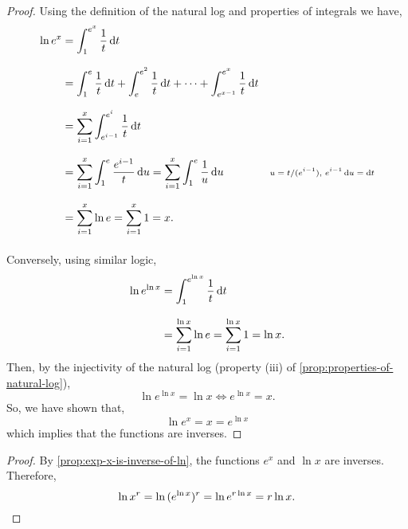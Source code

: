 \documentclass[MathsNotesBase.tex]{subfiles}
\begin{document}
{	\bigskip\bigskip
	\begin{proof}
		Using the definition of the natural log and properties of integrals we have,
		\begin{align*}
		\ln{e^x} &= \int_1^{e^x} \frac{1}{t} \dif t \\[8pt]
		  		 &= \int_1^{e} \frac{1}{t} \dif t + \int_e^{e^2} \frac{1}{t} \dif t + \cdots + \int_{e^{x-1}}^{e^x} \frac{1}{t} \dif t &\sidecomment{} \\[8pt]
		  		 &= \sum_{i=1}^x \int_{e^{i-1}}^{e^i} \frac{1}{t} \dif t \\[8pt]
		  		 &= \sum_{i=1}^x \int_{1}^e \frac{e^{i-1}}{t} \dif u = \sum_{i=1}^x \int_{1}^e \frac{1}{u} \dif u &\sidecomment{${ u = t/(e^{i-1}),\, e^{i-1}\dif u = \dif t }$}\\[8pt]
		  		 &= \sum_{i=1}^x \ln{e} = \sum_{i=1}^x 1 = x. \\[8pt]
		\end{align*}
		Conversely, using similar logic,
		\begin{align*}
		&& \ln{e^{\ln{x}}} &= \int_1^{e^{\ln{x}}} \frac{1}{t} \dif t \\[8pt]
		&&  &= \sum_{i=1}^{\ln{x}} \ln{e} = \sum_{i=1}^{\ln{x}} 1 = \ln{x}. &\sidecomment{} \\
		\end{align*}
		Then, by the injectivity of the natural log (property (iii) of \autoref{prop:properties-of-natural-log}),
		\[ \ln{e^{\ln{x}}} = \ln{x} \iff e^{\ln{x}} = x. \]
		So, we have shown that,
		\[ \ln{e^x} = x = e^{\ln{x}} \]
		which implies that the functions are inverses.
	\end{proof}

	
	\bigskip\bigskip
	\begin{proof}
		By \autoref{prop:exp-x-is-inverse-of-ln}, the functions ${ e^x }$ and ${ \ln{x} }$ are inverses. Therefore,
		\[ \ln{x^r} = \ln{(e^{\ln{x}})^r} = \ln{e^{r\ln{x}}} = r\ln{x}. \qedhere \]
	\end{proof}
	

}
\end{document}
